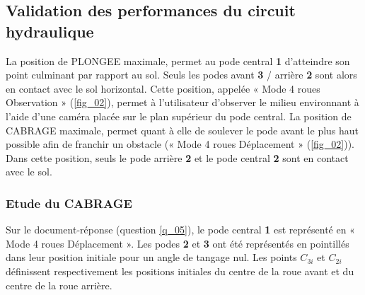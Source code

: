 
\subsection{Validation des performances du circuit hydraulique}

La position de PLONGEE maximale, permet au pode central \textbf{1} d’atteindre son point culminant par rapport au sol. Seuls
les podes avant \textbf{3} / arrière \textbf{2} sont alors en contact avec le sol horizontal. Cette position, appelée « Mode 4 roues
Observation » (\autoref{fig_02}), permet à l’utilisateur d’observer le milieu environnant à l’aide d’une caméra placée sur le plan
supérieur du pode central. La position de CABRAGE maximale, permet quant à elle de soulever le pode avant le plus
haut possible afin de franchir un obstacle (« Mode 4 roues Déplacement » (\autoref{fig_02})). Dans cette position, seuls le
pode arrière \textbf{2} et le pode central \textbf{2} sont en contact avec le sol.

\subsubsection{Etude du CABRAGE}

Sur le document-réponse (question \ref{q_05}), le pode central \textbf{1} est représenté en « Mode 4 roues Déplacement ». Les
podes \textbf{2} et \textbf{3} ont été représentés en pointillés dans leur position initiale pour un angle de tangage nul. Les points $C_{3i}$
et $C_{2i}$ définissent respectivement les positions initiales du centre de la roue avant et du centre de la roue arrière.


